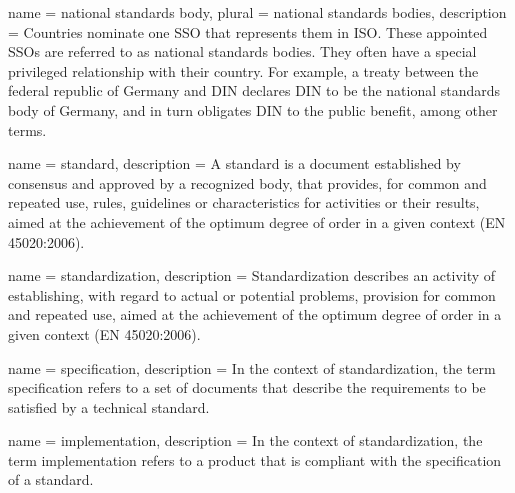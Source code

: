 { name = {national standards body}, plural =
  {national standards bodies}, description = {Countries nominate one
    \gls{SSO} that represents them in \gls{ISO}. These appointed
    \glspl{SSO} are referred to as national standards bodies. They
    often have a special privileged relationship with their
    country. For example, a treaty between the federal republic of
    Germany and DIN declares DIN to be the national standards body of
    Germany, and in turn obligates DIN to the public benefit, among
    other terms.}}

 { name = {standard},
  description = {A standard is a document established by consensus and
    approved by a recognized body, that provides, for common and
    repeated use, rules, guidelines or characteristics for activities
    or their results, aimed at the achievement of the optimum degree
    of order in a given context (EN 45020:2006).} }

 { name = {standardization},
  description = {Standardization describes an activity of
    establishing, with regard to actual or potential problems,
    provision for common and repeated use, aimed at the achievement of
    the optimum degree of order in a given context (EN 45020:2006).} }



 { name = {specification}, description = {In
    the context of \gls{standardization}, the term specification
    refers to a set of documents that describe the requirements to be
    satisfied by a technical standard.} }

 { name = {implementation}, description = {In
    the context of \gls{standardization}, the term implementation
    refers to a product that is compliant with the specification of a
    standard.} }

